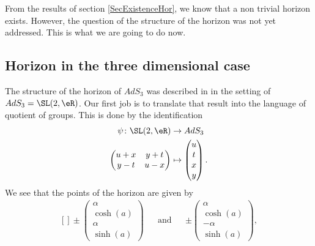 From the results of section \ref{SecExistenceHor}, we know that a non trivial horizon exists. However, the question of the structure of the horizon was not yet addressed. This is what we are going to do now.

\subsection{Horizon in the three dimensional case}
\label{SubSecHorInThreeDimensionOld}

The structure of the horizon of $AdS_3$ was described in \cite{Keio} in the setting of $AdS_3=\SL(2,\eR)$. Our first job is to translate that result into the language of quotient of groups. This is done by the identification
\begin{equation}
	\begin{aligned}
		\psi\colon \SL(2,\eR)&\to AdS_3 \\
		\begin{pmatrix}
			u+x	&	y+t	\\ 
			y-t	&	u-x	
		\end{pmatrix}&\mapsto \begin{pmatrix}
			u	\\ 
			t	\\ 
			x	\\ 
			y	
		\end{pmatrix}.
	\end{aligned}
\end{equation}
We see that the points of the horizon are given by
\begin{equation}			\label{EqHOrAdSTroisVecteur}
	\begin{aligned}[]
		\pm\begin{pmatrix}
			\alpha	\\ 
			\cosh(a)	\\ 
			\alpha	\\ 
			\sinh(a)	
		\end{pmatrix}&&\text{and}&&\pm\begin{pmatrix}
			\alpha	\\ 
			\cosh(a)	\\ 
			-\alpha	\\ 
			\sinh(a)	
		\end{pmatrix},
	\end{aligned}
\end{equation}
